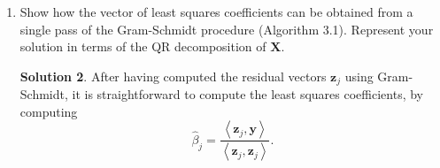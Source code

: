 \documentclass[]{book}
\theoremstyle{definition}
\newtheorem*{soln}{Solution}
\newcommand{\ip}[2]{\left\langle{#1},{#2}\right\rangle}
\newcommand{\XX}{\mathbf{X}} \newcommand{\YY}{\mathbf{Y}}
\newcommand{\DD}{\mathbf{D}}
\newcommand{\yy}{\mathbf{y}}
\newcommand{\cc}{\mathbf{c}}
\newcommand{\zz}{\mathbf{z}}
\begin{document}
\begin{enumerate}
\begin{soln}
\begin{enumerate}
			We now compute the variance of $\tilde\theta$:
			\begin{equation}
				\begin{split}
					\Var[\tilde\theta] &= \Var[\cc^T\yy] \\
					&= \cc^T\Var[\yy]\cc \\
					&= \sigma^2\cc^T\cc \\
					&= \sigma^2(\cc_0^T+d^T)(\cc_0+d) \\
					&= \sigma^2(a^T(\XX^T\XX)^{-1}\XX^T+d^T)(\XX(\XX^T\XX)^{-1}a+d) \\
					&= \sigma^2a^T(\XX^T\XX)^{-1} a + \sigma^2d^Td \\
					&= a^T\sigma^2(\XX^T\XX)^{-1}a + \sigma^2d^Td \\
					&= a^T\Var[\hat\beta]a + \sigma^2d^Td \\
					&= \Var[\hat\theta] + \sigma^2\|d\|^2 \\
					&\ge \Var[\hat\theta].
				\end{split}
			\end{equation}

			\item We can show that this extends to the whole variance-covariance matrix.
			Letting the above $a=I$ the identity matrix and $d=\DD$ any $(p+1)\times(p+1)$
			matrix, we get that 
			\begin{equation}
				\begin{split}
					\Var[\tilde\beta] &= \Var[\hat\beta] + \sigma^2\DD^T\DD
				\end{split}
			\end{equation}
			Therefore, $\Var[\hat\beta]-\Var[\tilde\beta] = \sigma^2\DD^T\DD$ is 
			a Gram matrix and therefore positive-semidefinite.
		\end{enumerate}

		\paragraph{Note.} Another way of stating the Gauss-Markov theorem is that 
		the least squares estimator $\hat\beta$ is \emph{BLUE}: best linear
		unbiased estimator.
	\end{soln}

	\item\label{ex:3.4} Show how the vector of least squares coefficients can 
	be obtained from a single pass of the Gram-Schmidt procedure (Algorithm 3.1).
	Represent your solution in terms of the QR decomposition of $\XX$.

	\begin{soln}
		After having computed the residual vectors $\zz_j$ using Gram-Schmidt, it is straightforward
		to compute the least squares coefficients, by computing
		\[\hat\beta_j=\frac{\ip{\zz_j}{\yy}}{\ip{\zz_j}{\zz_j}}.\]
	\end{soln}
\end{enumerate}
\end{document}
